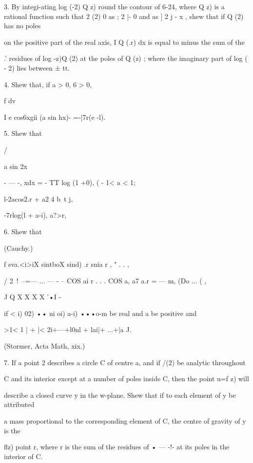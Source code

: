 {3. By integi-ating log (-2) Q z) round the contour of 6-24, where Q z)
is a rational function such that 2 (2) 0 as ; 2 |- 0 and as ] 2 j - x
, shew that if Q (2) has no poles

on the positive part of the real axis, I Q (.r) dx is equal to minus
the sum of the

.' residues of log -z)Q (2) at the poles of Q (z) ; where the
imaginary part of log ( - 2) lies between ± tt.

4. Shew that, if a > 0, 6 > 0,



f dv

I e cos6xgii (a sin hx)- =-|7r(e -l).



5. Shew that



/



a sin 2x



- — -, xdx = - TT log (1 +0), ( - 1< a < 1;

l-2acos2.r + a2 4 b\ t j, \



-7rlog(l + a-i), a?>r,



6. Shew that



(Cauchy.)



f sva.<i>iX sintboX sind) .r snia r , " . . ,

/ 2\ !\ --=— ... — - -- COS ai r . . . COS a, a7 a.r = — m, (Do ... (
,

J Q X X X X '•I -

if < i) 02) •• ni oi) a-i) •••o-m be real and a be positive and

 >1< 1 | + |< 2i+---+l0nl + lai|+ ...+|a J.

(Stormer, Acta Math, xix.)

7. If a point 2 describes a circle C of centre a, and if /(2) be
analytic throughout

C and its interior except at a number of poles inside C, then the
point u=f z) will

describe a closed curve y in the w-plane. Shew that if to each element
of y be attributed

a mass proportional to the corresponding element of C, the centre of
gravity of y is the

flz) point r, where r is the sum of the residues of • — -!- at its
poles in the interior of C.



}
